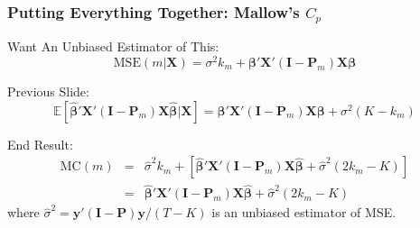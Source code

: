 \begin{frame}
  \frametitle{Putting Everything Together: Mallow's $C_p$}

  \begin{block}{Want An Unbiased Estimator of This:}
    \vspace{-1em}
  \[\text{MSE}(m|\mathbf{X}) = \sigma^2 k_m + \boldsymbol{\beta}'\mathbf{X}'(\mathbf{I} - \mathbf{P}_m)\mathbf{X}\boldsymbol{\beta}\]
\end{block}

\vspace{-1em}
\begin{block}{Previous Slide:}
  \vspace{-1em}
  \[
    \mathbb{E}\left[ \widehat{\boldsymbol{\beta}}'\mathbf{X}'(\mathbf{I} - \mathbf{P}_m) \mathbf{X}\widehat{\boldsymbol{\beta}}|\mathbf{X}\right] = \boldsymbol{\beta}' \mathbf{X}' (\mathbf{I} - \mathbf{P}_m)\mathbf{X} \boldsymbol{\beta} + \sigma^2(K - k_m)
   \]
 \end{block}

 \pause

 \begin{alertblock}{End Result:}
   \vspace{-2.5em}
   \begin{eqnarray*}
     \text{MC}(m) &=& \widehat{\sigma}^2 k_m  + \left[ \widehat{\boldsymbol{\beta}}'\mathbf{X}'(\mathbf{I} - \mathbf{P}_m)\mathbf{X}\widehat{\boldsymbol{\beta}} +  \widehat{\sigma}^2 (2k_m - K) \right]\\
     &=& \widehat{\boldsymbol{\beta}}'\mathbf{X}'(\mathbf{I} - \mathbf{P}_m)\mathbf{X}\widehat{\boldsymbol{\beta}} + \widehat{\sigma}^2(2 k_m - K) 
   \end{eqnarray*}
   where $\widehat{\sigma}^2 = \mathbf{y}'(\mathbf{I} - \mathbf{P})\mathbf{y}/(T-K)$ is an unbiased estimator of MSE. 
 \end{alertblock}

\end{frame}
